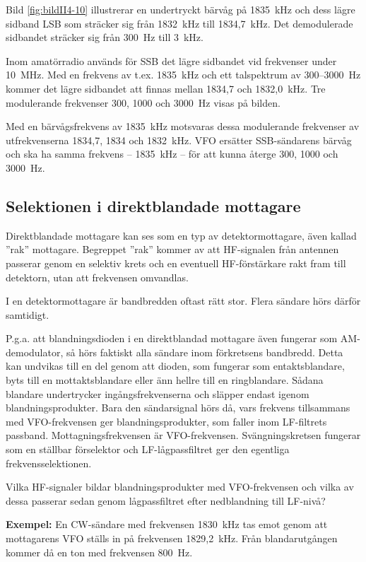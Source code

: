 Bild \ref{fig:bildII4-10} illustrerar en undertryckt bärvåg på 1835~kHz och
dess lägre sidband LSB som sträcker sig från 1832~kHz till 1834,7~kHz.
Det demodulerade sidbandet sträcker sig från 300~Hz till 3~kHz. 

Inom amatörradio används för SSB det lägre sidbandet vid frekvenser
under 10~MHz.
Med en frekvens av t.ex. 1835~kHz och ett talspektrum av 300--3000~Hz kommer
det lägre sidbandet att finnas mellan 1834,7 och 1832,0~kHz.
Tre modulerande frekvenser 300, 1000 och 3000~Hz visas på bilden.

Med en bärvågsfrekvens av 1835~kHz motsvaras dessa modulerande
frekvenser av utfrekvenserna 1834,7, 1834 och 1832~kHz.
VFO ersätter SSB-sändarens bärvåg och ska ha samma frekvens -- 1835~kHz --
för att kunna återge 300, 1000 och 3000~Hz.

\subsection{Selektionen i direktblandade mottagare}

Direktblandade mottagare kan ses som en typ av detektormottagare, även
kallad ''rak'' mottagare.
Begreppet ''rak'' kommer av att HF-signalen från antennen passerar genom en
selektiv krets och en eventuell HF-förstärkare rakt fram till detektorn,
utan att frekvensen omvandlas.

I en detektormottagare är bandbredden oftast rätt stor.
Flera sändare hörs därför samtidigt.

P.g.a. att blandningsdioden i en direktblandad mottagare även fungerar
som AM-demodulator, så hörs faktiskt alla sändare inom förkretsens bandbredd.
Detta kan undvikas till en del genom att dioden, som fungerar som
entaktsblandare, byts till en mottaktsblandare eller änn hellre till en
ringblandare.
Sådana blandare undertrycker ingångsfrekvenserna och släpper endast igenom
blandningsprodukter.
Bara den sändarsignal hörs då, vars frekvens tillsammans med VFO-frekvensen
ger blandningsprodukter, som faller inom LF-filtrets passband.
Mottagningsfrekvensen är VFO-frekvensen.
Svängningskretsen fungerar som en ställbar förselektor och LF-lågpassfiltret
ger den egentliga frekvensselektionen.

Vilka HF-signaler bildar blandningsprodukter med VFO-frekvensen och
vilka av dessa passerar sedan genom lågpassfiltret efter nedblandning
till LF-nivå?

\textbf{Exempel:}
En CW-sändare med frekvensen 1830~kHz tas emot genom att
mottagarens VFO ställs in på frekvensen 1829,2~kHz.
Från blandarutgången kommer då en ton med frekvensen 800~Hz.

